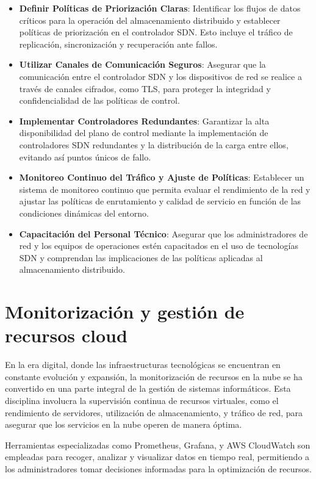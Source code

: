 {            \begin{itemize}
                \item \textbf{Definir Políticas de Priorización Claras}: Identificar los flujos de datos críticos para la operación del almacenamiento distribuido y establecer políticas de priorización en el controlador SDN. Esto incluye el tráfico de replicación, sincronización y recuperación ante fallos.
                \item \textbf{Utilizar Canales de Comunicación Seguros}: Asegurar que la comunicación entre el controlador SDN y los dispositivos de red se realice a través de canales cifrados, como TLS, para proteger la integridad y confidencialidad de las políticas de control.
                \item \textbf{Implementar Controladores Redundantes}: Garantizar la alta disponibilidad del plano de control mediante la implementación de controladores SDN redundantes y la distribución de la carga entre ellos, evitando así puntos únicos de fallo.
                \item \textbf{Monitoreo Continuo del Tráfico y Ajuste de Políticas}: Establecer un sistema de monitoreo continuo que permita evaluar el rendimiento de la red y ajustar las políticas de enrutamiento y calidad de servicio en función de las condiciones dinámicas del entorno.
                \item \textbf{Capacitación del Personal Técnico}: Asegurar que los administradores de red y los equipos de operaciones estén capacitados en el uso de tecnologías SDN y comprendan las implicaciones de las políticas aplicadas al almacenamiento distribuido.
            \end{itemize}
                    
    \section{Monitorización y gestión de recursos cloud}
        En la era digital, donde las infraestructuras tecnológicas se encuentran en constante evolución y expansión, la monitorización de recursos en la nube se ha convertido en una parte integral de la gestión de sistemas informáticos. Esta disciplina involucra la supervisión continua de recursos virtuales, como el rendimiento de servidores, utilización de almacenamiento, y tráfico de red, para asegurar que los servicios en la nube operen de manera óptima. 
        
        Herramientas especializadas como Prometheus, Grafana, y AWS CloudWatch son empleadas para recoger, analizar y visualizar datos en tiempo real, permitiendo a los administradores tomar decisiones informadas para la optimización de recursos.
        
}
